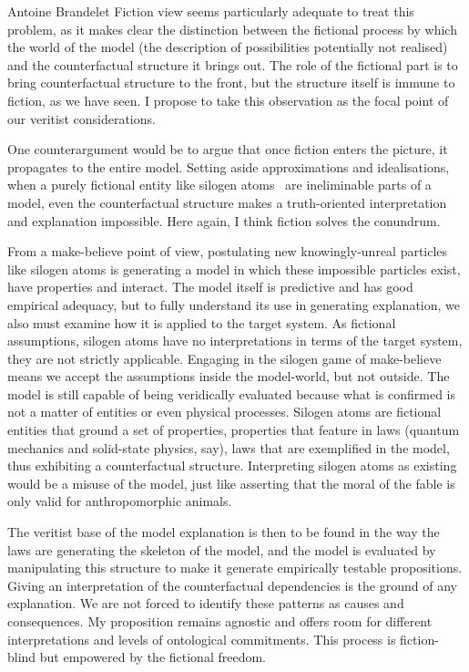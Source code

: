 \begin{artengenv}{Antoine Brandelet}
Fiction view seems particularly adequate to treat this problem, as it makes clear the distinction between the fictional process by which the world of the model (the description of possibilities potentially not realised) and the counterfactual structure it brings out. The role of the fictional part is to bring counterfactual structure to the front, but the structure itself is immune to fiction, as we have seen. I propose to take this observation as the focal point of our veritist considerations.

One counterargument would be to argue that once fiction enters the picture, it propagates to the entire model. Setting aside approximations and idealisations, when a purely fictional entity like silogen atoms~\parencite{Winsberg2006} are ineliminable parts of a model, even the counterfactual structure makes a truth-oriented interpretation and explanation impossible. Here again, I think fiction solves the conundrum.

From a make-believe point of view, postulating new knowingly-unreal particles like silogen atoms is generating a model in which these impossible particles exist, have properties and interact. The model itself is predictive and has good empirical adequacy, but to fully understand its use in generating explanation, we also must examine how it is applied to the target system. As fictional assumptions, silogen atoms have no interpretations in terms of the target system, they are not strictly applicable. Engaging in the silogen game of make-believe means we accept the assumptions inside the model-world, but not outside. The model is still capable of being veridically evaluated because what is confirmed is not a matter of entities or even physical processes. Silogen atoms are fictional entities that ground a set of properties, properties that feature in laws (quantum mechanics and solid-state physics, say), laws that are exemplified in the model, thus exhibiting a counterfactual structure. Interpreting silogen atoms as existing would be a misuse of the model, just like asserting that the moral of the fable is only valid for anthropomorphic animals.

The veritist base of the model explanation is then to be found in the way the laws are generating the skeleton of the model, and the model is evaluated by manipulating this structure to make it generate empirically testable propositions. Giving an interpretation of the counterfactual dependencies is the ground of any explanation. We are not forced to identify these patterns as causes and consequences. My proposition remains agnostic and offers room for different interpretations and levels of ontological commitments. This process is fiction-blind but empowered by the fictional freedom.



\end{artengenv}
